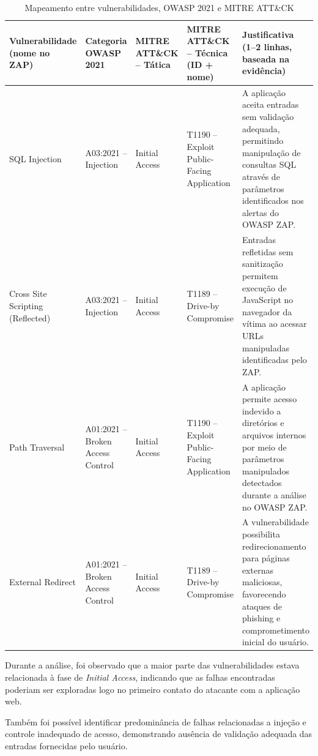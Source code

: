 \begin{table}[H]
  \centering
  \caption{Mapeamento entre vulnerabilidades, OWASP 2021 e MITRE ATT\&CK}
  \label{tab:owasp_mitre}
  \renewcommand{\arraystretch}{1.4}
  \begin{tabular}{|p{2.6cm}|p{1.9cm}|p{2.1cm}|p{2.5cm}|p{4.25cm}|}
    \hline
    \textbf{Vulnerabilidade (nome no ZAP)} &
    \textbf{Categoria OWASP 2021} &
    \textbf{MITRE ATT\&CK -- Tática} &
    \textbf{MITRE ATT\&CK -- Técnica (ID + nome)} &
    \textbf{Justificativa (1--2 linhas, baseada na evidência)} \\
    \hline

    SQL Injection &
    A03:2021 -- Injection &
    Initial Access &
    T1190 -- Exploit Public-Facing Application &
    A aplicação aceita entradas sem validação adequada, permitindo manipulação
    de consultas SQL através de parâmetros identificados nos alertas do OWASP
    ZAP. \\
    \hline

    Cross Site Scripting (Reflected) &
    A03:2021 -- Injection &
    Initial Access &
    T1189 -- Drive-by Compromise &
    Entradas refletidas sem sanitização permitem execução de JavaScript no
    navegador da vítima ao acessar URLs manipuladas identificadas pelo ZAP. \\
    \hline

    Path Traversal &
    A01:2021 -- Broken Access Control &
    Initial Access &
    T1190 -- Exploit Public-Facing Application &
    A aplicação permite acesso indevido a diretórios e arquivos internos por
    meio de parâmetros manipulados detectados durante a análise no OWASP ZAP.
    \\
    \hline

    External Redirect &
    A01:2021 -- Broken Access Control &
    Initial Access &
    T1189 -- Drive-by Compromise &
    A vulnerabilidade possibilita redirecionamento para páginas externas
    maliciosas, favorecendo ataques de phishing e comprometimento inicial do
    usuário. \\
    \hline

  \end{tabular}
\end{table}

Durante a análise, foi observado que a maior parte das vulnerabilidades estava
relacionada à fase de \textit{Initial Access}, indicando que as falhas
encontradas poderiam ser exploradas logo no primeiro contato do atacante com a
aplicação web.

Também foi possível identificar predominância de falhas relacionadas a injeção
e controle inadequado de acesso, demonstrando ausência de validação adequada
das entradas fornecidas pelo usuário.

